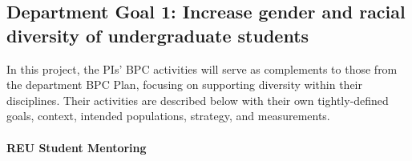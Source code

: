 \subsection*{Department Goal 1: Increase gender and racial diversity of undergraduate
students}

In this project, the PIs' BPC activities will serve as complements to those from the department BPC
Plan, focusing on supporting diversity within their disciplines. Their activities are
described below with their own tightly-defined goals, context, intended
populations, strategy, and measurements.

\paragraph*{REU Student Mentoring}

